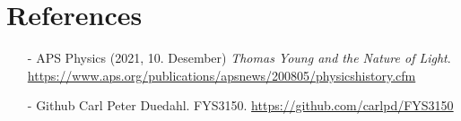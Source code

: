 \documentclass[reprint,english,notitlepage]{revtex4-2}  %
\begin{document}
\section{References}  %
\begin{itemize}
	\item[-] APS Physics (2021, 10. Desember) \emph{Thomas Young and the Nature of Light}. \url{https://www.aps.org/publications/apsnews/200805/physicshistory.cfm }
	\item[-] Github Carl Peter Duedahl. FYS3150. \url{https://github.com/carlpd/FYS3150 }
\end{itemize}
\end{document}
